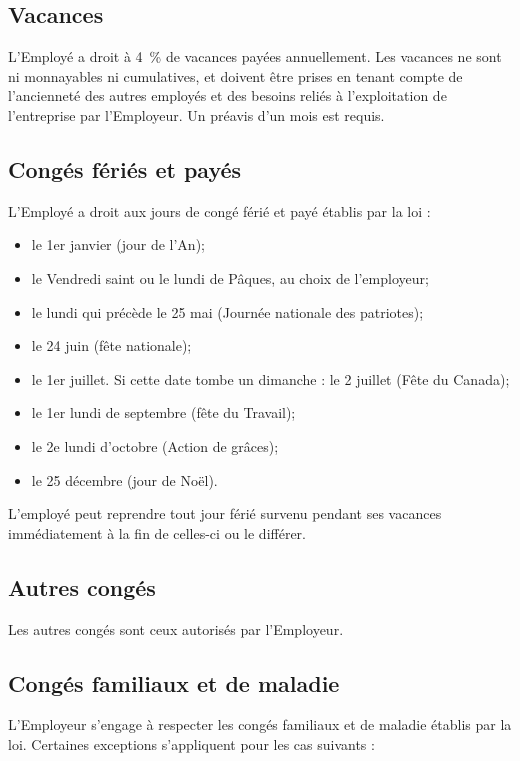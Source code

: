\documentclass{article}
\begin{document}
    	\subsection{Vacances}
    	L'Employé a droit à \SI{4}{\%} de vacances payées annuellement. Les vacances ne sont ni monnayables ni cumulatives, et doivent être prises en tenant compte de l'ancienneté des autres employés et des besoins reliés à l'exploitation de l'entreprise par l'Employeur. Un préavis d'un mois est requis.    	
    	
    	\subsection{Congés fériés et payés}
    	L'Employé a droit aux jours de congé férié et payé établis par la loi :
    	
    	\begin{itemize}
    		\item le 1er janvier (jour de l’An);
			\item le Vendredi saint ou le lundi de Pâques, au choix de l’employeur;
			\item le lundi qui précède le 25 mai (Journée nationale des patriotes);
			\item le 24 juin (fête nationale);
			\item le 1er juillet. Si cette date tombe un dimanche : le 2 juillet (Fête du Canada);
			\item le 1er lundi de septembre (fête du Travail);
			\item le 2e lundi d’octobre (Action de grâces);
			\item le 25 décembre (jour de Noël).
    	\end{itemize}
    	
    	 L'employé peut reprendre tout jour férié survenu pendant ses vacances immédiatement à la fin de celles-ci ou le différer.
    	
    	\subsection{Autres congés}
    	Les autres congés sont ceux autorisés par l'Employeur.
    	
    	\subsection{Congés familiaux et de maladie}
    	L'Employeur s'engage à respecter les congés familiaux et de maladie établis par la loi. Certaines exceptions s'appliquent pour les cas suivants :
    	
\end{document}

